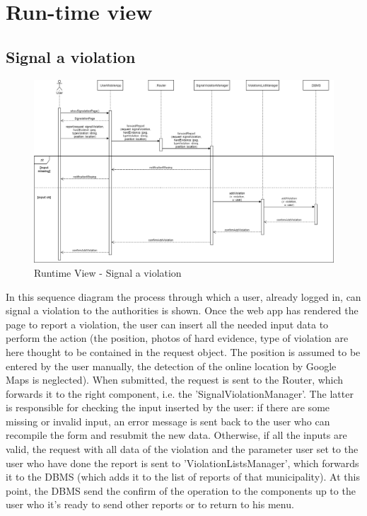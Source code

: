     \section{Run-time view}
        \subsection{Signal a violation}
        \begin{figure}[H]
            \includegraphics[scale=0.35]{dd/resources/images/RuntimeView-SignalViolation}
            \caption{Runtime View - Signal a violation}        
        \end{figure}
        In this sequence diagram the process through which a user, already
        logged in, can signal a violation to the authorities is shown. Once the
        web app has rendered the page to report a violation, the user can insert
        all the needed input data to perform the action (the position, photos of
        hard evidence, type of violation are here thought to be contained in the
        request object. The position is assumed to be entered by the user
        manually, the detection of the online location by Google Maps is
        neglected). When submitted, the request is sent to the Router, which
        forwards it to the right component, i.e. the 'SignalViolationManager'.
        The latter is responsible for checking the input inserted by the user:
        if there are some missing or invalid input, an error message is sent
        back to the user who can recompile the form and resubmit the new data.
        Otherwise, if all the inputs are valid, the request with all data of the
        violation and the parameter user set to the user who have done the
        report is sent to 'ViolationListsManager', which forwards it to the DBMS
        (which adds it to the list of reports of that municipality). At this
        point, the DBMS send the confirm of the operation to the components up
        to the user who it's ready to send other reports or to return to his
        menu.

